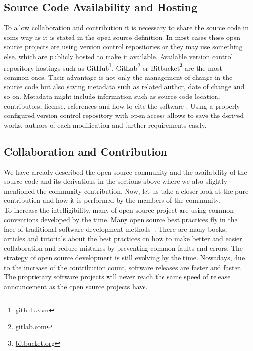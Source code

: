 \documentclass[12pt,a4paper]{article}
\theoremstyle{definition}
\begin{document}
    \subsection{Source Code Availability and Hosting}

    To allow collaboration and contribution it is necessary to share the source code in some way as it is stated in the open source definition. In most cases these open source projects are using version control repositories or they may use something else, which are publicly hosted to make it available. Available version control repository hostings such as GitHub\footnote{\href{https://github.com/}{github.com}}, GitLab\footnote{\href{https://gitlab.com/}{gitlab.com}} or Bitbucket\footnote{\href{https://bitbucket.org/}{bitbucket.org}} are the most common ones. Their advantage is not only the management of change in the source code but also saving metadata such as related author, date of change and so on. Metadata might include information such as source code location, contributors, license, references and how to cite the software \cite{IEEE:OS-BP}. Using a properly configured version control repository with open access allows to save the derived works, authors of each modification and further requirements easily.

    \subsection{Collaboration and Contribution}

    We have already described the open source community and the availability of the source code and its derivations in the sections above where we also slightly mentioned the community contribution. Now, let us take a closer look at the pure contribution and how it is performed by the members of the community.\\

    To increase the intelligibility, many of open source project are using common conventions developed by the time. Many open source best practices fly in the face of traditional software development methods~\cite{KATSAMAKAS2019100872}. There are many books, articles and tutorials about the best practices on how to make better and easier collaboration and reduce mistakes by preventing common faults and errors. The strategy of open source development is still evolving by the time. Nowadays, due to the increase of the contribution count, software releases are faster and faster. The proprietary software projects will never reach the same speed of release announcement as the open source projects have.
\end{document}
